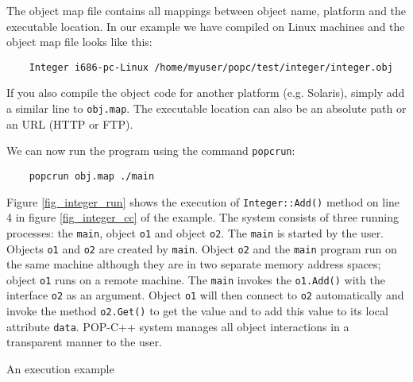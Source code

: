 The object map file contains all mappings between object name,
platform and the executable location. In our example we have compiled on Linux machines and the object map file looks like this:

\vspace{4mm}
\begin{verbatim}
    Integer i686-pc-Linux /home/myuser/popc/test/integer/integer.obj
\end{verbatim}
\vspace{4mm}

If you also compile the object code for another platform (e.g. Solaris), simply
add a similar line to \texttt{obj.map}. The executable location can also be an
absolute path or an URL (HTTP or FTP). 

We can now run the program using the command \texttt{popcrun}:

\vspace{3mm}
\begin{verbatim}
    popcrun obj.map ./main
\end{verbatim}
\vspace{4mm}

Figure \ref{fig_integer_run} shows the execution of \texttt{Integer::Add()}
method on line 4 in figure \ref{fig_integer_cc} of the example. The system
consists of three running processes: the \texttt{main}, object
\texttt{o1} and object \texttt{o2}. The \texttt{main} is started by the
user. Objects \texttt{o1} and \texttt{o2} are created by \texttt{main}.
Object \texttt{o2} and the \texttt{main} program run on the same machine
although they are in two separate memory address spaces; object \texttt{o1} runs
on a remote machine. The \texttt{main} invokes the \texttt{o1.Add()}
with the interface \texttt{o2} as an argument. Object \texttt{o1} will
then connect to \texttt{o2} automatically and invoke the method
\texttt{o2.Get()} to get the value and to add this value to its local
attribute \texttt{data}. POP-C++ system manages all object interactions
in a transparent manner to the user.

{An execution example}
